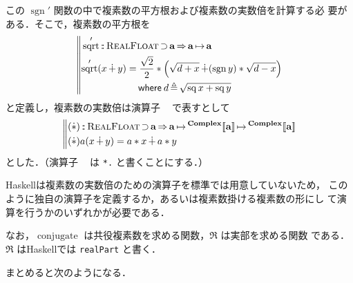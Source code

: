 \documentclass[a5paper,twoside,fleqn,draft]{jsbook}
\def\[{[\![}
\def\]{]\!]}
\DeclareMathOperator{\sgn}{sgn}
\newcommand{\programminglanguage}[1]{\textsf{#1}}
\newcommand{\haskell}{\programminglanguage{Haskell}}
\newcommand{\code}[1]{\texttt{#1}}
\newenvironment{haskellcode}{\begin{itembox}[r]{\haskell}}{\end{itembox}}
\newcommand{\mBrace}{\Vert}
\newcommand{\mKeyword}[1]{\mathsf{#1}}
\newcommand{\mWhereKeyword}{\mKeyword{where}}
\DeclareMathOperator{\mSuperClass}{\Rightarrow}
\DeclareMathOperator{\mSuperSet}{\supset}
\newcommand{\mSpecialFunc}[1]{#1}
\DeclareMathOperator{\mConjugate}{\mSpecialFunc{conjugate}}
\DeclareMathOperator{\mSq}{\mSpecialFunc{sq}}
\DeclareMathOperator{\mSqrt}{\mSpecialFunc{sqrt}}
\DeclareMathOperator{\mComplexPlus}{\dotplus}
\DeclareMathOperator{\mComplexTimes}{\Dot\ast}
\DeclareMathOperator{\mIn}{{:\!:}}
\DeclareMathOperator{\mLetEq}{\triangleq}
\DeclareMathOperator{\mMapsTo}{\mapsto}
\newcommand{\mType}[1]{\mathbf{#1}} %
\newcommand{\mA}{\mType{a}}
\newcommand{\mTypeAssemble}[2]{{}^{\mType{#1}}\[\mType{#2}\]}
\newcommand{\mComplexType}[1]{\mTypeAssemble{Complex}{#1}}
\newcommand{\mTypeClass}[1]{\textsc{#1}} %
\newcommand{\mRealFloatTypeClass}{\mTypeClass{RealFloat}}
\newcommand{\mProjEXP}[2]{#1\mMapsTo#2} %
\newcommand{\mWhereIsEXP}[2]{\mathbin{\mWhereKeyword}#1\mLetEq#2} %
\begin{document}
この $\sgn'$ 関数の中で複素数の平方根および複素数の実数倍を計算する必
要がある．そこで，複素数の平方根を
\begin{equation}
  \left\mBrace
  \begin{aligned}
    &\mSqrt'\mIn\mRealFloatTypeClass\mSuperSet\mA
    \mSuperClass\mProjEXP{\mA }{\mA }\\
    &\begin{aligned}
       \mSqrt'(x\mComplexPlus y)
       &=\frac{\sqrt{2}}{2}*\left(\sqrt{d+x}\mComplexPlus(\sgn y)*\sqrt{d-x}\right)\\
       &\quad\mWhereIsEXP{d}{\sqrt{\mSq x+\mSq y}}
     \end{aligned}
  \end{aligned}
  \right.
\end{equation}
と定義し，複素数の実数倍は演算子 $\mComplexTimes$ で表すとして
\begin{equation}
  \left\mBrace
  \begin{aligned}
    &(\mComplexTimes)\mIn\mRealFloatTypeClass\mSuperSet\mA \mSuperClass
    \mProjEXP{\mA }{\mProjEXP{\mComplexType{a}}{\mComplexType{a}}}\\
    &(\mComplexTimes)a(x\mComplexPlus y)=a*x\mComplexPlus a*y
  \end{aligned}
  \right.
\end{equation}
とした．（演算子 $\mComplexTimes$ は \code{*.} と書くことにする．）

\haskell は複素数の実数倍のための演算子を標準では用意していないため，
このように独自の演算子を定義するか，あるいは複素数掛ける複素数の形にし
て演算を行うかのいずれかが必要である．


なお，$\mConjugate$ は共役複素数を求める関数，$\Re$ は実部を求める関数
である．$\Re$ は\haskell では \code{realPart} と書く．

まとめると次のようになる．
\end{document}
